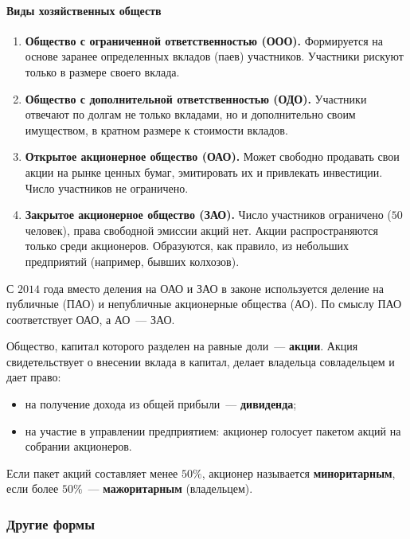 \documentclass[12pt]{article}
\begin{document}
	\paragraph{Виды хозяйственных обществ}
	\begin{enumerate}
		\item \textbf{Общество с ограниченной ответственностью (ООО).} Формируется на основе заранее определенных вкладов (паев) участников. Участники рискуют только в размере своего вклада.
		\item \textbf{Общество с дополнительной ответственностью (ОДО).} Участники отвечают по долгам не только вкладами, но и дополнительно своим имуществом, в кратном размере к стоимости вкладов.
		\item \textbf{Открытое акционерное общество (ОАО).} Может свободно продавать свои акции на рынке ценных бумаг, эмитировать их и привлекать инвестиции. Число участников не ограничено.
		\item \textbf{Закрытое акционерное общество (ЗАО).} Число участников ограничено ($50$ человек), права свободной эмиссии акций нет. Акции распространяются только среди акционеров. Образуются, как правило, из небольших предприятий (например, бывших колхозов).
	\end{enumerate}

	\begin{note}
		С $2014$ года вместо деления на ОАО и ЗАО в законе используется деление на публичные (ПАО) и непубличные акционерные общества (АО). По смыслу ПАО соответствует ОАО, а АО~--- ЗАО.
	\end{note}

	\begin{definition}
		Общество, капитал которого разделен на равные доли~--- \textbf{акции}. Акция свидетельствует о внесении вклада в капитал, делает владельца совладельцем и дает право:
		\begin{itemize}
			\item на получение дохода из общей прибыли~--- \textbf{дивиденда};
			\item на участие в управлении предприятием: акционер голосует пакетом акций на собрании акционеров.
		\end{itemize}
		Если пакет акций составляет менее $50\%$, акционер называется \textbf{миноритарным}, если более $50\%$~--- \textbf{мажоритарным} (владельцем).
	\end{definition}

	\subsubsection{Другие формы}
\end{document}
